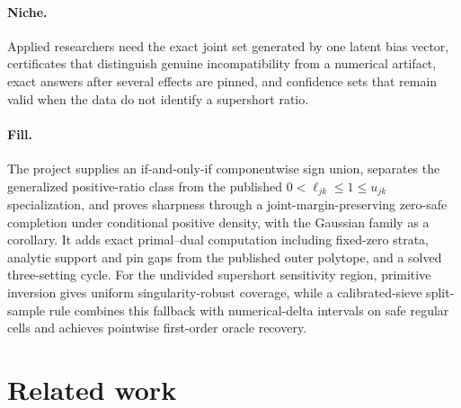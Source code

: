 \documentclass{article}
\begin{document}
\paragraph{Niche.} Applied researchers need the exact joint set generated by one latent bias vector, certificates that distinguish genuine incompatibility from a numerical artifact, exact answers after several effects are pinned, and confidence sets that remain valid when the data do not identify a supershort ratio.

\paragraph{Fill.} The project supplies an if-and-only-if componentwise sign union, separates the generalized positive-ratio class from the published \(0<\ell_{jk}\le1\le u_{jk}\) specialization, and proves sharpness through a joint-margin-preserving zero-safe completion under conditional positive density, with the Gaussian family as a corollary.  It adds exact primal--dual computation including fixed-zero strata, analytic support and pin gaps from the published outer polytope, and a solved three-setting cycle.  For the undivided supershort sensitivity region, primitive inversion gives uniform singularity-robust coverage, while a calibrated-sieve split-sample rule combines this fallback with numerical-delta intervals on safe regular cells and achieves pointwise first-order oracle recovery.

\section{Related work}
\end{document}
